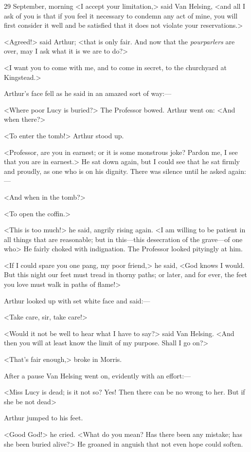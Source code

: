 \begin{diary}{29 September, morning}
<I accept your limitation,> said Van Helsing, <and all I ask of you is that if you feel it necessary to condemn any act of mine, you will first consider it well and be satisfied that it does not violate your reservations.>

<Agreed!> said Arthur; <that is only fair. And now that the \textit{pourparlers} are over, may I ask what it is we are to do?>

<I want you to come with me, and to come in secret, to the churchyard at Kingstead.>

Arthur's face fell as he said in an amazed sort of way:—

<Where poor Lucy is buried?> The Professor bowed. Arthur went on: <And when there?>

<To enter the tomb!> Arthur stood up.

<Professor, are you in earnest; or it is some monstrous joke? Pardon me, I see that you are in earnest.> He sat down again, but I could see that he sat firmly and proudly, as one who is on his dignity. There was silence until he asked again:—

<And when in the tomb?>

<To open the coffin.>

<This is too much!> he said, angrily rising again. <I am willing to be patient in all things that are reasonable; but in this—this desecration of the grave—of one who\longdash> He fairly choked with indignation. The Professor looked pityingly at him.

<If I could spare you one pang, my poor friend,> he said, <God knows I would. But this night our feet must tread in thorny paths; or later, and for ever, the feet you love must walk in paths of flame!>

Arthur looked up with set white face and said:—

<Take care, sir, take care!>

<Would it not be well to hear what I have to say?> said Van Helsing. <And then you will at least know the limit of my purpose. Shall I go on?>

<That's fair enough,> broke in Morris.

After a pause Van Helsing went on, evidently with an effort:—

<Miss Lucy is dead; is it not so? Yes! Then there can be no wrong to her. But if she be not dead\longdash>

Arthur jumped to his feet.

<Good God!> he cried. <What do you mean? Has there been any mistake; has she been buried alive?> He groaned in anguish that not even hope could soften.


\end{diary}
